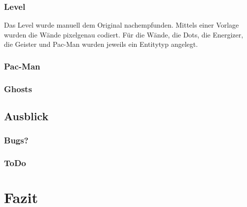 \documentclass[a4paper, 11pt]{article}
\begin{document}
\subsubsection{Level}
Das Level wurde manuell dem Original nachempfunden. Mittels einer Vorlage wurden die Wände pixelgenau codiert. Für die Wände, die Dots, die Energizer, die Geister und Pac-Man wurden jeweils ein Entitytyp angelegt. 

\subsubsection{Pac-Man}

\subsubsection{Ghosts}

\subsection{Ausblick}

\subsubsection{Bugs?}

\subsubsection{ToDo}

\section{Fazit}

\pagebreak



\end{document}
